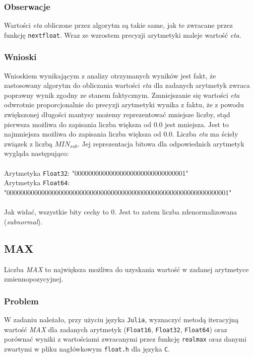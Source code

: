 \documentclass{article}
\begin{document}
\subsubsection{Obserwacje}
Wartości \textit{eta} obliczone przez algorytm są takie same, jak te zwracane przez funkcję \texttt{nextfloat}. Wraz ze wzrostem precyzji arytmetyki maleje wartość \textit{eta}.

\subsubsection{Wnioski}
Wnioskiem wynikającym z analizy otrzymanych wyników jest fakt, że zastosowany algorytm do obliczania wartości \textit{eta} dla zadanych arytmetyk zwraca poprawny wynik zgodny ze stanem faktycznym. Zmniejszanie się wartości \textit{eta} odwrotnie proporcjonalnie do precyzji arytmetyki wynika z faktu, że z powodu zwiększonej długości mantysy możemy reprezentować mniejsze liczby, stąd pierwsza możliwa do zapisania liczba większa od $0.0$ jest mniejsza. Jest to najmniejsza możliwa do zapisania liczba większa od $0.0$. Liczba \textit{eta} ma ścisły związek z liczbą $MIN_{sub}$. Jej reprezentacja bitowa dla odpowiednich arytmetyk wygląda następująco: \\\\
Arytmetyka \texttt{Float32}: "00000000000000000000000000000001" \\
Arytmetyka \texttt{Float64}: "0000000000000000000000000000000000000000000000000000000000000001"\\\\
Jak widać, wszystkie bity cechy to $0$. Jest to zatem liczba zdenormalizowana (\textit{subnormal}).

\subsection{MAX}
Liczba \textit{MAX} to największa możliwa do uzyskania wartość w zadanej arytmetyce zmiennopozycyjnej.

\subsubsection{Problem}
W zadaniu należało, przy użyciu języka \texttt{Julia}, wyznaczyć metodą iteracyjną wartość \textit{MAX} dla zadanych arytmetyk (\texttt{Float16}, \texttt{Float32}, \texttt{Float64}) oraz porównać wyniki z wartościami zwracanymi przez funkcję \texttt{realmax} oraz danymi zwartymi w pliku nagłówkowym \texttt{float.h} dla języka \texttt{C}.
\end{document}
